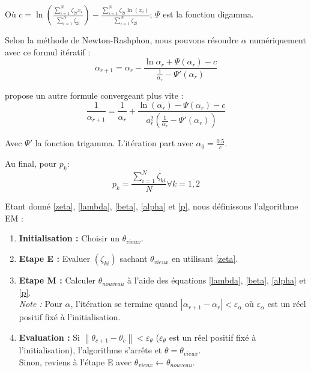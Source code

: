 \documentclass[10pt,a4paper]{article}
\begin{document}
Où $c = \ln \left( {\frac{{\sum\limits_{i = 1}^N {{\zeta _{2i}}{x_i}} }}{{\sum\limits_{i = 1}^N {{\zeta _{2i}}} }}} \right) - \frac{{\sum\limits_{i = 1}^N {{\zeta _{2i}}\ln \left( {{x_i}} \right)} }}{{\sum\limits_{i = 1}^N {{\zeta _{2i}}} }}$; $\Psi$ est la fonction digamma.

Selon la méthode de Newton-Rashphon, nous pouvons résoudre $\alpha$ numériquement avec ce formul itératif :
\[{\alpha _{r + 1}} = {\alpha _r} - \frac{{\ln {\alpha _r} + \Psi \left( {{\alpha _r}} \right) - c}}{{\frac{1}{{{\alpha _r}}} - \Psi '\left( {{\alpha _r}} \right)}}\]

\cite{bib:gamma} propose un autre formule convergeant plus vite :
\begin{equation}
    \label{alpha}
    \frac{1}{{{\alpha _{r + 1}}}} = \frac{1}{{{\alpha _r}}} + \frac{{\ln \left( {{\alpha _r}} \right) - \Psi \left( {{\alpha _r}} \right) - c}}{{a_r^2\left( {\frac{1}{{{\alpha _r}}} - \Psi '\left( {{\alpha _r}} \right)} \right)}}
\end{equation}

Avec $\Psi'$ la fonction trigamma. L'itération part avec ${\alpha _0} = \frac{{0.5}}{c}$.

Au final, pour $p_k$:
\begin{equation}
    \label{p}
    {p_k} = \frac{{\sum\limits_{i = 1}^N {{\zeta _{ki}}} }}{N}\forall k = \overline {1,2}
\end{equation}

Etant donné \eqref{zeta}, \eqref{lambda}, \eqref{beta}, \eqref{alpha} et \eqref{p}, nous définissons l'algorithme EM :
\begin{enumerate}
    \item \textbf{Initialisation :} Choisir un $\theta_{vieux}$.
    \item \textbf{Etape E :} Evaluer $(\zeta_{ki})$ sachant $\theta_{vieux}$ en utilisant \eqref{zeta}.
    \item \textbf{Etape M :} Calculer $\theta_{nouveau}$ à l'aide des équations \eqref{lambda}, \eqref{beta}, \eqref{alpha} et \eqref{p}. \\
    \emph{Note :} Pour $\alpha$, l'itération se termine quand $\left| {{\alpha _{r + 1}} - {\alpha _r}} \right| < {\varepsilon_\alpha }$ où $\varepsilon_\alpha$ est un réel positif fixé à l'initialisation.
    \item \textbf{Evaluation :} Si $\left\| {{\theta _{c + 1}} - {\theta _c}} \right\| < {\varepsilon _\theta }$ ($\varepsilon_\theta$ est un réel positif fixé à l'initialisation), l'algorithme s'arrête et $\theta = \theta_{vieux}$. \\ Sinon, reviens à l'étape E avec $\theta_{vieux} \leftarrow \theta_{nouveau}$.
\end{enumerate}
\end{document}
